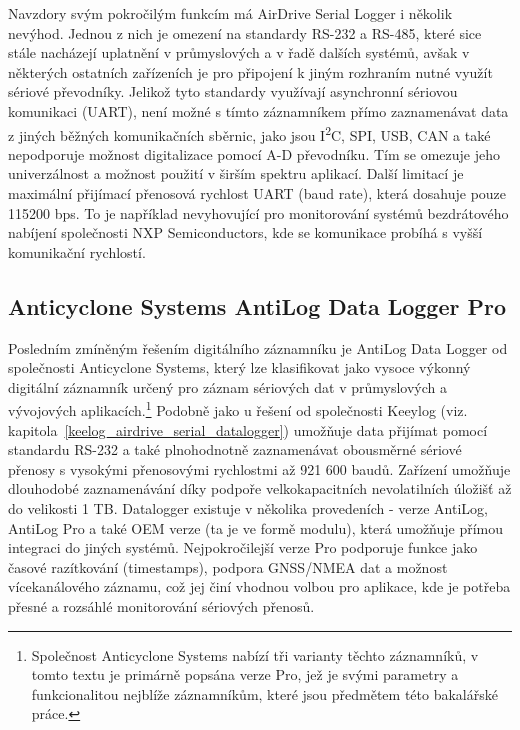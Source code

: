 Navzdory svým pokročilým funkcím má AirDrive Serial Logger i několik nevýhod. Jednou z nich je omezení na standardy RS-232 a RS-485, které sice stále nacházejí uplatnění v průmyslových a v řadě dalších systémů, avšak v některých ostatních zařízeních je pro připojení k jiným rozhraním nutné využít sériové převodníky. Jelikož tyto standardy využívají asynchronní sériovou komunikaci (UART), není možné s tímto záznamníkem přímo zaznamenávat data z jiných běžných komunikačních sběrnic, jako jsou I\textsuperscript{2}C, SPI, USB, CAN a také nepodporuje možnost digitalizace pomocí A-D převodníku. Tím se omezuje jeho univerzálnost a možnost použití v širším spektru aplikací. Další limitací je maximální přijímací přenosová rychlost UART (baud rate), která dosahuje pouze 115200 bps. To je například nevyhovující pro monitorování systémů bezdrátového nabíjení společnosti NXP Semiconductors, kde se komunikace probíhá s vyšší komunikační rychlostí. \cite{keelog_airdrive_serial_datalogger}

\subsection{Anticyclone Systems AntiLog Data Logger Pro}
\label{anticyclone_systems_antilog_data_logger}
Posledním zmíněným řešením digitálního záznamníku je AntiLog Data Logger od společnosti Anticyclone Systems, který lze klasifikovat jako vysoce výkonný digitální záznamník určený pro záznam sériových dat v průmyslových a vývojových aplikacích.\footnote{Společnost Anticyclone Systems nabízí tři varianty těchto záznamníků, v tomto textu je primárně popsána verze Pro, jež je svými parametry a funkcionalitou nejblíže záznamníkům, které jsou předmětem této bakalářské práce.} Podobně jako u řešení od společnosti Keeylog (viz. kapitola~\ref{keelog_airdrive_serial_datalogger}) umožňuje data přijímat pomocí standardu RS-232 a také plnohodnotně zaznamenávat obousměrné sériové přenosy s vysokými přenosovými rychlostmi až 921 600 baudů. Zařízení umožňuje dlouhodobé zaznamenávání díky podpoře velkokapacitních nevolatilních úložišť až do velikosti 1 TB. Datalogger existuje v několika provedeních - verze AntiLog, AntiLog Pro a také OEM verze (ta je ve formě modulu), která umožňuje přímou integraci do jiných systémů. Nejpokročilejší verze Pro podporuje funkce jako časové razítkování (timestamps), podpora GNSS/NMEA dat a možnost vícekanálového záznamu, což jej činí vhodnou volbou pro aplikace, kde je potřeba přesné a rozsáhlé monitorování sériových přenosů. \cite{anticyclone_systems_antilog_pro}

